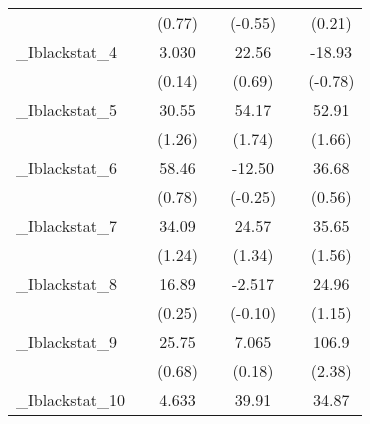 {\begin{tabular}{l*{6}{c}}
            &                     &      (0.77)         &                     &     (-0.55)         &                     &      (0.21)         \\
[1em]
\_Iblackstat\_4&                     &       3.030         &                     &       22.56         &                     &      -18.93         \\
            &                     &      (0.14)         &                     &      (0.69)         &                     &     (-0.78)         \\
[1em]
\_Iblackstat\_5&                     &       30.55         &                     &       54.17         &                     &       52.91         \\
            &                     &      (1.26)         &                     &      (1.74)         &                     &      (1.66)         \\
[1em]
\_Iblackstat\_6&                     &       58.46         &                     &      -12.50         &                     &       36.68         \\
            &                     &      (0.78)         &                     &     (-0.25)         &                     &      (0.56)         \\
[1em]
\_Iblackstat\_7&                     &       34.09         &                     &       24.57         &                     &       35.65         \\
            &                     &      (1.24)         &                     &      (1.34)         &                     &      (1.56)         \\
[1em]
\_Iblackstat\_8&                     &       16.89         &                     &      -2.517         &                     &       24.96         \\
            &                     &      (0.25)         &                     &     (-0.10)         &                     &      (1.15)         \\
[1em]
\_Iblackstat\_9&                     &       25.75         &                     &       7.065         &                     &       106.9\sym{*}  \\
            &                     &      (0.68)         &                     &      (0.18)         &                     &      (2.38)         \\
[1em]
\_Iblackstat\_10&                     &       4.633         &                     &       39.91         &                     &       34.87         \\

\end{tabular}}
